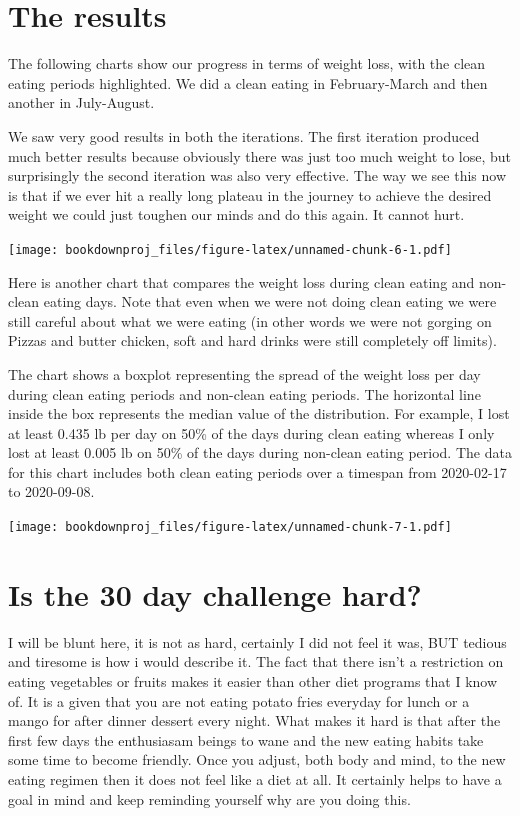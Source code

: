 \documentclass[oneside]{book}
\begin{document}
\section{The results}\label{the-results}

The following charts show our progress in terms of weight loss, with the
clean eating periods highlighted. We did a clean eating in
February-March and then another in July-August.

We saw very good results in both the iterations. The first iteration
produced much better results because obviously there was just too much
weight to lose, but surprisingly the second iteration was also very
effective. The way we see this now is that if we ever hit a really long
plateau in the journey to achieve the desired weight we could just
toughen our minds and do this again. It cannot hurt.

\texttt{[image: bookdownproj\_files/figure-latex/unnamed-chunk-6-1.pdf]}

Here is another chart that compares the weight loss during clean eating
and non-clean eating days. Note that even when we were not doing clean
eating we were still careful about what we were eating (in other words
we were not gorging on Pizzas and butter chicken, soft and hard drinks
were still completely off limits).

The chart shows a boxplot representing the spread of the weight loss per
day during clean eating periods and non-clean eating periods. The
horizontal line inside the box represents the median value of the
distribution. For example, I lost at least 0.435 lb per day on 50\% of
the days during clean eating whereas I only lost at least 0.005 lb on
50\% of the days during non-clean eating period. The data for this chart
includes both clean eating periods over a timespan from 2020-02-17 to
2020-09-08.

\texttt{[image: bookdownproj\_files/figure-latex/unnamed-chunk-7-1.pdf]}

\section{Is the 30 day challenge
hard?}\label{is-the-30-day-challenge-hard}

I will be blunt here, it is not as hard, certainly I did not feel it
was, BUT tedious and tiresome is how i would describe it. The fact that
there isn't a restriction on eating vegetables or fruits makes it easier
than other diet programs that I know of. It is a given that you are not
eating potato fries everyday for lunch or a mango for after dinner
dessert every night. What makes it hard is that after the first few days
the enthusiasam beings to wane and the new eating habits take some time
to become friendly. Once you adjust, both body and mind, to the new
eating regimen then it does not feel like a diet at all. It certainly
helps to have a goal in mind and keep reminding yourself why are you
doing this.
\end{document}
